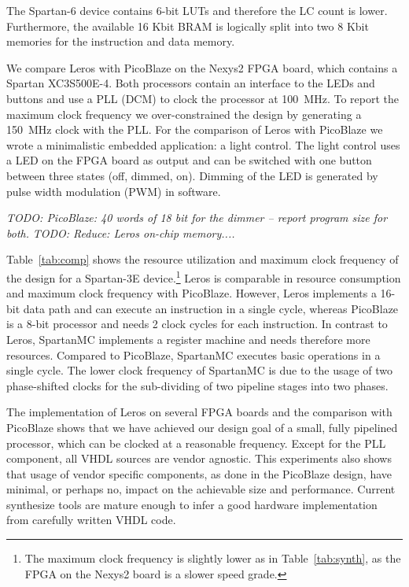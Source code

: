 \documentclass[a4paper,fontsize=10pt,twoside,DIV15,BCOR12mm,headinclude=true,footinclude=false,pagesize,bibtotoc]{scrbook}
\newcommand{\todo}[1]{{\emph{TODO: #1}}}
\begin{document}

The Spartan-6 device contains 6-bit LUTs and therefore the LC count is lower. Furthermore, the available 16 Kbit BRAM is logically split into two 8 Kbit memories for the instruction and data memory.


We compare Leros with PicoBlaze on the Nexys2 FPGA board, which contains a Spartan XC3S500E-4. Both processors contain an interface to the LEDs and buttons and use a PLL (DCM) to clock the processor at 100~MHz. To report the maximum clock frequency we over-constrained the design by generating a 150~MHz clock with the PLL.
For the comparison of Leros with PicoBlaze we wrote a minimalistic embedded application: a light control. The light control uses a LED on the FPGA board as output and can be switched with one button between three states (off, dimmed, on). Dimming of the LED is generated by pulse width modulation (PWM) in software.

\todo{PicoBlaze: 40 words of 18 bit for the dimmer -- report program size for both.}
\todo{Reduce: Leros on-chip memory....}

Table~\ref{tab:comp} shows the resource utilization and maximum clock frequency of the design for a Spartan-3E device.\footnote{The maximum clock frequency is slightly lower as in Table~\ref{tab:synth}, as the FPGA on the Nexys2 board is a slower speed grade.} Leros is comparable in resource consumption and maximum clock frequency with PicoBlaze. However, Leros implements a 16-bit data path and can execute an instruction in a single cycle, whereas PicoBlaze is a 8-bit processor and needs 2 clock cycles for each instruction.
%
In contrast to Leros, SpartanMC implements a register machine and needs therefore more resources. Compared to PicoBlaze, SpartanMC executes basic operations in a single cycle. The lower clock frequency of SpartanMC is due to the usage of two phase-shifted clocks for the sub-dividing of two pipeline stages into two phases.



The implementation of Leros on several FPGA boards and the comparison with PicoBlaze shows that we have achieved our design goal of a small, fully pipelined processor, which can be clocked at a reasonable frequency. Except for the PLL component, all VHDL sources are vendor agnostic. This experiments also shows that usage of vendor specific components, as done in the PicoBlaze design, have minimal, or perhaps no, impact on the achievable size and performance. Current synthesize tools are mature enough to infer a good hardware implementation from carefully written VHDL code.
\end{document}
